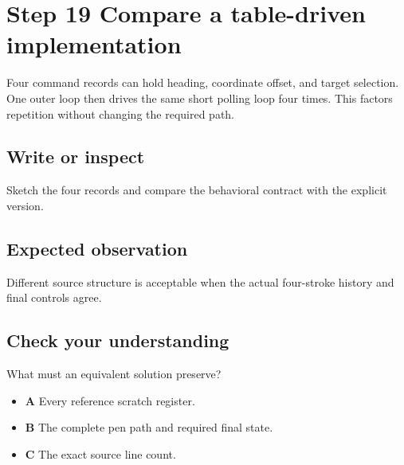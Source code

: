 \section{Step 19 Compare a table-driven
  implementation}\label{006-marsbot-square-s19-step-19-compare-a-table-driven-implementation}

Four command records can hold heading, coordinate offset, and target
selection. One outer loop then drives the same short polling loop four
times. This factors repetition without changing the required path.

\subsection{Write or
  inspect}\label{006-marsbot-square-s19-write-or-inspect}

Sketch the four records and compare the behavioral contract with the
explicit version.

\subsection{Expected
  observation}\label{006-marsbot-square-s19-expected-observation}

Different source structure is acceptable when the actual four-stroke
history and final controls agree.

\subsection{Check your
  understanding}\label{006-marsbot-square-s19-check-your-understanding}

What must an equivalent solution preserve?

\begin{itemize}
  \tightlist
  \item
        \textbf{A} Every reference scratch register.
  \item
        \textbf{B} The complete pen path and required final state.
  \item
        \textbf{C} The exact source line count.
\end{itemize}
